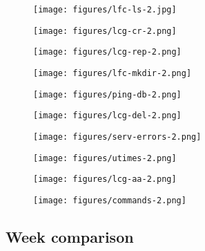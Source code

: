\documentclass[a4paper, 11pt]{article} %
\begin{document}
\begin{figure}[H]
  \centering
    \texttt{[image: figures/lfc-ls-2.jpg]}
\end{figure}
\begin{figure}[H]
  \centering
    \texttt{[image: figures/lcg-cr-2.png]}
\end{figure}
\begin{figure}[H]
  \centering
    \texttt{[image: figures/lcg-rep-2.png]}
\end{figure}
\begin{figure}[H]
  \centering
    \texttt{[image: figures/lfc-mkdir-2.png]}
\end{figure}
\begin{figure}[H]
  \centering
    \texttt{[image: figures/ping-db-2.png]}
\end{figure}
\begin{figure}[H]
  \centering
    \texttt{[image: figures/lcg-del-2.png]}
\end{figure}
\begin{figure}[H]
  \centering
    \texttt{[image: figures/serv-errors-2.png]}
\end{figure}
\begin{figure}[H]
  \centering
    \texttt{[image: figures/utimes-2.png]}
\end{figure}
\begin{figure}[H]
  \centering
    \texttt{[image: figures/lcg-aa-2.png]}
\end{figure}

\begin{figure}[H]
  \centering
    \texttt{[image: figures/commands-2.png]}
\end{figure}


\subsection{Week comparison}
\end{document}
